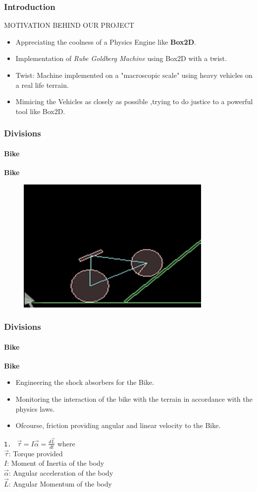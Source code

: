 \begin{frame}
\frametitle{Introduction}
MOTIVATION BEHIND OUR PROJECT
\begin{itemize}
  \item Appreciating the coolness of a Physics Engine like \textbf{Box2D}. \pause
  \item Implementation of {\em Rube Goldberg Machine} using Box2D with a twist. \pause
  \item \alert{Twist}: Machine implemented on a "macroscopic scale" using heavy vehicles on a real life terrain. \pause 
  \item Mimicing the Vehicles as closely as possible ,trying to do justice to a powerful tool like Box2D. 

\end{itemize}
\end{frame}

\begin{frame}
\frametitle{Divisions}
\framesubtitle{Bike}
  \textbf{Bike}
  \begin{figure}
  \includegraphics[width=.6\textwidth,center]{./Screenshots/bike.jpg}
  \end{figure}
\end{frame}

\begin{frame}
\frametitle{Divisions}
\framesubtitle{Bike}
  \textbf{Bike} \pause
  \begin{itemize}
    \item Engineering the shock absorbers for the Bike. \pause
    \item Monitoring the interaction of the bike with the terrain in accordance with the physics laws. \pause
    \item Ofcourse, friction providing angular and linear velocity to the Bike. \pause
  \end{itemize}
\texttt{1. } $ \overrightarrow{\tau} = I\overrightarrow{\alpha} = \frac{d \overrightarrow{L}}{dt} $  \pause where \\
  $ \overrightarrow{\tau} $: Torque provided \\
  $ I $: Moment of Inertia of the body \\
  $ \overrightarrow{\alpha} $: Angular acceleration of the body \\
  $ \overrightarrow{L} $: Angular Momentum of the body 
\end{frame}


